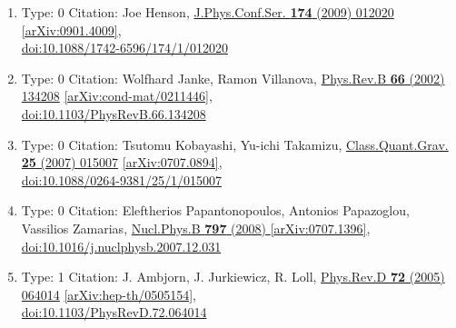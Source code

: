 \documentclass[a4paper,10pt]{article}
\begin{document}
\begin{enumerate}
\begin{enumerate}
  \item Type: 0 Citation: Joe Henson, \href{https://www.doi.org/10.1088/1742-6596/174/1/012020}{J.Phys.Conf.Ser. {\bf 174} (2009) 012020}  \href{https://arxiv.org/abs/0901.4009}{[arXiv:0901.4009]},\\\href{https://www.doi.org/10.1088/1742-6596/174/1/012020}{doi:10.1088/1742-6596/174/1/012020}
  \item Type: 0 Citation: Wolfhard Janke, Ramon Villanova, \href{https://www.doi.org/10.1103/PhysRevB.66.134208}{Phys.Rev.B {\bf 66} (2002) 134208}  \href{https://arxiv.org/abs/cond-mat/0211446}{[arXiv:cond-mat/0211446]},\\\href{https://www.doi.org/10.1103/PhysRevB.66.134208}{doi:10.1103/PhysRevB.66.134208}
  \item Type: 0 Citation: Tsutomu Kobayashi, Yu-ichi Takamizu, \href{https://www.doi.org/10.1088/0264-9381/25/1/015007}{Class.Quant.Grav. {\bf 25} (2007) 015007}  \href{https://arxiv.org/abs/0707.0894}{[arXiv:0707.0894]},\\\href{https://www.doi.org/10.1088/0264-9381/25/1/015007}{doi:10.1088/0264-9381/25/1/015007}
  \item Type: 0 Citation: Eleftherios Papantonopoulos, Antonios Papazoglou, Vassilios Zamarias, \href{https://www.doi.org/10.1016/j.nuclphysb.2007.12.031}{Nucl.Phys.B {\bf 797} (2008) }  \href{https://arxiv.org/abs/0707.1396}{[arXiv:0707.1396]},\\\href{https://www.doi.org/10.1016/j.nuclphysb.2007.12.031}{doi:10.1016/j.nuclphysb.2007.12.031}
  \item Type: 1 Citation: J. Ambjorn, J. Jurkiewicz, R. Loll, \href{https://www.doi.org/10.1103/PhysRevD.72.064014}{Phys.Rev.D {\bf 72} (2005) 064014}  \href{https://arxiv.org/abs/hep-th/0505154}{[arXiv:hep-th/0505154]},\\\href{https://www.doi.org/10.1103/PhysRevD.72.064014}{doi:10.1103/PhysRevD.72.064014}

\end{enumerate}
\end{enumerate}
\end{document}

